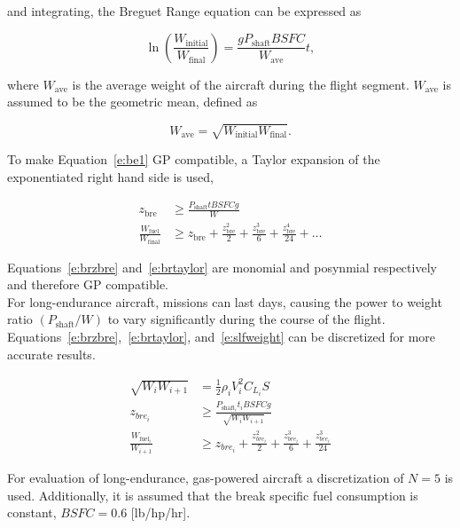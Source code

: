 \documentclass[]{aiaa-tc}%
\begin{document}
and integrating, the Breguet Range equation can be expressed as

\begin{equation}
    \label{e:be1}
    \ln{\left( \frac{W_{\text{initial}}}{W_{\text{final}}} \right)} = \frac{gP_{\text{shaft}}BSFC}{W_{\text{ave}}} t,
\end{equation}

where $W_{\text{ave}}$ is the average weight of the aircraft during the flight segment.  $W_{\text{ave}}$ is assumed to be the geometric mean, defined as

\begin{equation}
    \label{e:gpmean}
    W_{\text{ave}} = \sqrt{W_{\text{initial}}W_{\text{final}}}.
\end{equation}

    To make Equation~\eqref{e:be1} GP compatible, a Taylor expansion of the exponentiated right hand side is used,\cite{hoburgthesis}

\begin{align}
    \label{e:brzbre}
    z_{\text{bre}} &\geq \frac{P_{\text{shaft}}t BSFC g}{W}\\
    \label{e:brtaylor}
    \frac{W_{\text{fuel}}}{W_\text{final}} &\geq z_{\text{bre}} + \frac{z_{\text{bre}}^2}{2} + \frac{z_{\text{bre}}^3}{6} + \frac{z_{\text{bre}}^4}{24} + \dots
\end{align}

    Equations~\eqref{e:brzbre} and~\eqref{e:brtaylor} are monomial and posynmial respectively and therefore GP compatible. \\
    
    For long-endurance aircraft, missions can last days, causing the power to weight ratio $(P_{\text{shaft}}/W)$ to vary significantly during the course of the flight.  Equations~\eqref{e:brzbre},~\eqref{e:brtaylor}, and~\eqref{e:slfweight} can be discretized for more accurate results.

\begin{align}
    \label{e:slfweightd}
    \sqrt{W_i W_{i+1}} &= \frac{1}{2} \rho_i V_i^2 C_{L_i} S \\
    \label{e:brzbred}
    z_{bre_i} &\geq \frac{P_{\text{shaft}_i}t_i BSFC g}{\sqrt{W_i W_{i+1}}}\\
    \label{e:brtaylord}
    \frac{W_{\text{fuel}_i}}{W_{i+1}} &\geq z_{bre_i} + \frac{z_{bre_i}^2}{2} + \frac{z_{bre_i}^3}{6} + \frac{z_{bre_i}^3}{24} 
    \end{align}

    For evaluation of long-endurance, gas-powered aircraft a discretization of $N=5$ is used. Additionally, it is assumed that the break specific fuel consumption is constant, $BSFC = 0.6$ [lb/hp/hr].\cite{bsfcperf}
\end{document}
